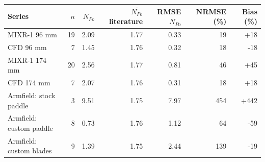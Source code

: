 \begin{tabular}{@{}lrrrrrr@{}}
\toprule
Series & $n$ & $\overline{N_{Po}}$ & $\overline{N_{Po}}$ literature & RMSE $N_{Po}$ & NRMSE (\%) & Bias (\%) \\
\midrule
MIXR-1 96 mm & 19 & 2.09 & 1.77 & 0.33 & 19 & +18 \\
CFD 96 mm & 7 & 1.45 & 1.76 & 0.32 & 18 & -18 \\
MIXR-1 174 mm & 20 & 2.56 & 1.77 & 0.81 & 46 & +45 \\
CFD 174 mm & 7 & 2.07 & 1.76 & 0.31 & 18 & +18 \\
Armfield: stock paddle & 3 & 9.51 & 1.75 & 7.97 & 454 & +442 \\
Armfield: custom paddle & 8 & 0.73 & 1.76 & 1.12 & 64 & -59 \\
Armfield: custom blades & 9 & 1.39 & 1.75 & 2.44 & 139 & -19 \\
\bottomrule
\end{tabular}
